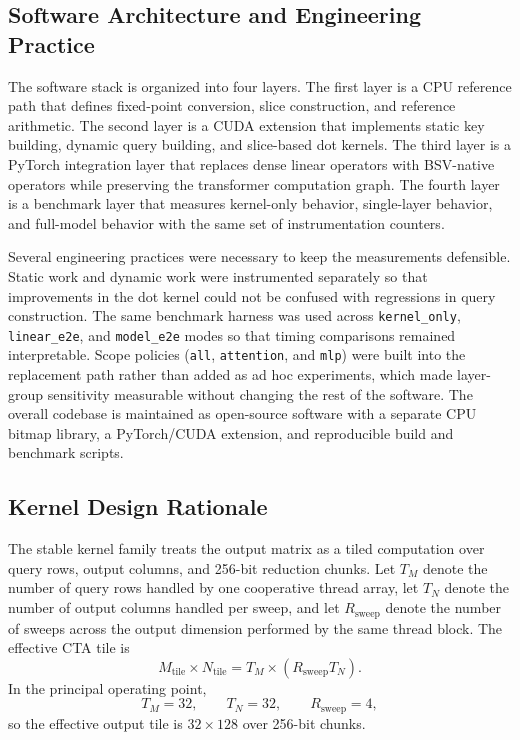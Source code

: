 \subsection{Software Architecture and Engineering Practice}
The software stack is organized into four layers. The first layer is a CPU reference path that defines fixed-point conversion, slice construction, and reference arithmetic. The second layer is a CUDA extension that implements static key building, dynamic query building, and slice-based dot kernels. The third layer is a PyTorch integration layer that replaces dense linear operators with BSV-native operators while preserving the transformer computation graph. The fourth layer is a benchmark layer that measures kernel-only behavior, single-layer behavior, and full-model behavior with the same set of instrumentation counters.

Several engineering practices were necessary to keep the measurements defensible. Static work and dynamic work were instrumented separately so that improvements in the dot kernel could not be confused with regressions in query construction. The same benchmark harness was used across \texttt{kernel\_only}, \texttt{linear\_e2e}, and \texttt{model\_e2e} modes so that timing comparisons remained interpretable. Scope policies (\texttt{all}, \texttt{attention}, and \texttt{mlp}) were built into the replacement path rather than added as ad hoc experiments, which made layer-group sensitivity measurable without changing the rest of the software. The overall codebase is maintained as open-source software with a separate CPU bitmap library, a PyTorch/CUDA extension, and reproducible build and benchmark scripts.

\subsection{Kernel Design Rationale}
The stable kernel family treats the output matrix as a tiled computation over query rows, output columns, and 256-bit reduction chunks. Let $T_M$ denote the number of query rows handled by one cooperative thread array, let $T_N$ denote the number of output columns handled per sweep, and let $R_{\mathrm{sweep}}$ denote the number of sweeps across the output dimension performed by the same thread block. The effective CTA tile is
\begin{equation}
    M_{\mathrm{tile}} \times N_{\mathrm{tile}} = T_M \times (R_{\mathrm{sweep}} T_N).
\end{equation}
In the principal operating point,
\begin{equation}
    T_M = 32, \qquad T_N = 32, \qquad R_{\mathrm{sweep}} = 4,
\end{equation}
so the effective output tile is $32 \times 128$ over 256-bit chunks.

